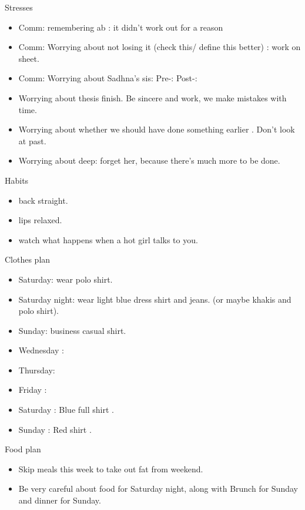 \documentclass[serif, mathserif, final]{beamer}
\begin{document}
\begin{frame}{}
\begin{columns}
\begin{column}{0.25\linewidth}
\begin{block}{ Stresses}
\begin{itemize}
    \item \tiny Comm: remembering ab : it didn't work out for a reason 
    \item \tiny Comm: Worrying about not losing it (check this/ define this better) : work on sheet. 
    \item \tiny Comm: Worrying about Sadhna's sis: Pre-: Post-: 
    \item \tiny Worrying about thesis finish. Be sincere and work, we make mistakes with time. 
    \item \tiny Worrying about whether we should have done something earlier . Don't look at past. 

    \item \tiny Worrying about deep: forget her, because there's much more to be done. 
    \end{itemize} 
  \end{block} 

  \begin{block}{ Habits } 
    \begin{itemize} 
      \tiny \item \tiny back straight. 
    \item \tiny lips relaxed. 
    \item \tiny watch what happens when a hot girl talks to you. 
    \end{itemize} 
  \end{block} 

  \begin{block}{Clothes plan} 
    \begin{itemize} 
      \tiny \item \tiny Saturday: wear polo shirt. 
    \item \tiny Saturday night: wear light blue dress shirt and jeans. (or maybe khakis and polo shirt). 
    \item \tiny Sunday: business casual shirt. 
    \item \tiny Wednesday : 
    \item \tiny Thursday: 
    \item \tiny Friday : 
    \item \tiny Saturday : Blue full shirt . 
    \item \tiny Sunday : Red shirt .
    \end{itemize} 
  \end{block} 
  \begin{block}{ Food plan } 
    \begin{itemize} 
      \tiny \item \tiny Skip meals this week to take out fat from weekend. 
    \item \tiny Be very careful about food for Saturday night, along with Brunch for Sunday and dinner for Sunday. 
    \end{itemize} 
  \end{block} 
  

\end{column}
\end{columns}
\end{frame}
\end{document}

